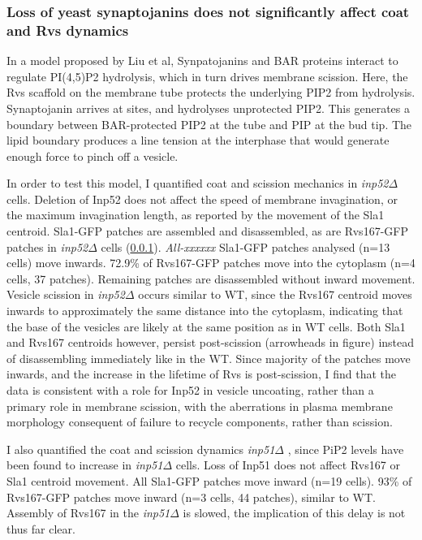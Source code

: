 		\subsubsection{Loss of yeast synaptojanins does not significantly affect coat and Rvs dynamics}
		In a model proposed by Liu et al, Synpatojanins and BAR proteins interact to regulate PI(4,5)P2 hydrolysis, which in turn drives membrane scission. Here, the Rvs scaffold on the membrane tube protects the underlying PIP2 from hydrolysis. Synaptojanin arrives at sites, and hydrolyses unprotected PIP2. This generates a boundary between BAR-protected PIP2 at the tube and PIP at the bud tip. The lipid boundary produces a line tension at the interphase that would generate enough force to pinch off a vesicle. 


		\vspace{5mm}
		In order to test this model, I quantified coat and scission mechanics in \textit{inp52$\Delta$ } cells.
		Deletion of Inp52 does not affect the speed of membrane invagination, or the maximum invagination length, as reported by the movement of the Sla1 centroid. Sla1-GFP patches are assembled and disassembled, as are Rvs167-GFP patches in \textit{inp52$\Delta$ } cells (\ref{}). \textit{All-xxxxxx} Sla1-GFP patches analysed (n=13 cells) move inwards. 72.9\% of Rvs167-GFP patches move into the cytoplasm (n=4 cells, 37 patches). Remaining patches are disassembled without inward movement. Vesicle scission in \textit{inp52$\Delta$ }occurs similar to WT, since the Rvs167 centroid moves inwards to approximately the same distance into the cytoplasm, indicating that the base of the vesicles are likely at the same position as in WT cells. Both Sla1 and Rvs167 centroids however, persist post-scission (arrowheads in figure) instead of disassembling immediately like in the WT. Since majority of the patches move inwards, and the increase in the lifetime of Rvs is post-scission, I find that the data is consistent with a role for Inp52 in vesicle uncoating, rather than a primary role in membrane scission, with the aberrations in plasma membrane morphology consequent of failure to recycle components, rather than scission. 


		\vspace{5mm}
		I also quantified the coat and scission dynamics \textit{inp51$\Delta$ }, since PiP2 levels have been found to increase in \textit{inp51$\Delta$ } cells. Loss of Inp51 does not affect Rvs167 or Sla1 centroid movement. All Sla1-GFP patches move inward (n=19 cells). 93\% of Rvs167-GFP patches move inward (n=3 cells, 44 patches), similar to WT. Assembly of Rvs167 in the \textit{inp51$\Delta$ }is slowed, the implication of this delay is not thus far clear. 

